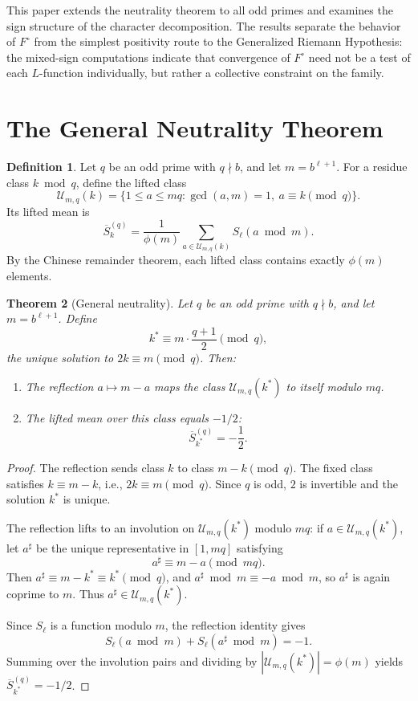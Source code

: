 \documentclass[12pt]{amsart}
\newtheorem{theorem}{Theorem}
\theoremstyle{definition}
\newtheorem{definition}[theorem]{Definition}
\theoremstyle{remark}
\begin{document}
This paper extends the neutrality theorem to all odd
primes and examines the sign structure of the character
decomposition. The results separate the behavior of
$F^{\circ}$ from the simplest positivity route to the
Generalized Riemann Hypothesis: the mixed-sign
computations indicate that convergence of $F^{\circ}$
need not be a test of each $L$-function individually,
but rather a collective constraint on the family.

\section{The General Neutrality Theorem}

\begin{definition}
Let $q$ be an odd prime with $q \nmid b$, and let
$m = b^{\ell+1}$. For a residue class $k \bmod q$,
define the lifted class
\[
\mathcal U_{m,q}(k)
=
\{1 \le a \le mq : \gcd(a,m)=1,\ a \equiv k \pmod q\}.
\]
Its lifted mean is
\[
\overline S^{(q)}_k
=
\frac{1}{\phi(m)}
\sum_{a \in \mathcal U_{m,q}(k)} S_\ell(a \bmod m).
\]
By the Chinese remainder theorem, each lifted class
contains exactly $\phi(m)$ elements.
\end{definition}

\begin{theorem}[General neutrality]\label{thm:general}
Let $q$ be an odd prime with $q \nmid b$, and let
$m = b^{\ell+1}$. Define
\[
k^{*} \equiv m \cdot \frac{q+1}{2} \pmod{q},
\]
the unique solution to $2k \equiv m \pmod{q}$. Then:
\begin{enumerate}
\item The reflection $a \mapsto m - a$ maps the class
$\mathcal U_{m,q}(k^{*})$ to itself modulo $mq$.
\item The lifted mean over this class equals $-1/2$:
\[
\overline S^{(q)}_{k^{*}} = -\frac12.
\]
\end{enumerate}
\end{theorem}

\begin{proof}
The reflection sends class $k$ to class
$m - k \pmod{q}$. The fixed class satisfies
$k \equiv m - k$, i.e., $2k \equiv m \pmod{q}$.
Since $q$ is odd, $2$ is invertible and the solution
$k^{*}$ is unique.

The reflection lifts to an involution on
$\mathcal U_{m,q}(k^{*})$ modulo $mq$: if
$a \in \mathcal U_{m,q}(k^{*})$, let $a^{\sharp}$ be
the unique representative in $[1,mq]$ satisfying
\[
a^{\sharp} \equiv m-a \pmod{mq}.
\]
Then $a^{\sharp} \equiv m-k^{*} \equiv k^{*} \pmod q$,
and $a^{\sharp} \bmod m \equiv -a \bmod m$, so
$a^{\sharp}$ is again coprime to $m$. Thus
$a^{\sharp} \in \mathcal U_{m,q}(k^{*})$.

Since $S_\ell$ is a function modulo $m$, the reflection
identity gives
\[
S_\ell(a \bmod m) + S_\ell(a^{\sharp} \bmod m) = -1.
\]
Summing over the involution pairs and dividing by
$|\mathcal U_{m,q}(k^{*})| = \phi(m)$ yields
$\overline S^{(q)}_{k^{*}} = -1/2$.
\end{proof}
\end{document}
